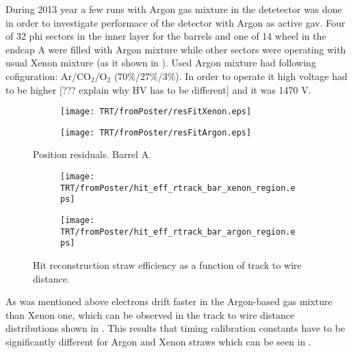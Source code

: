 During 2013 year a few runs with Argon gas mixture in the detetector was done in order to investigate performace of the detector with Argon as active gav.
Four of 32 phi sectors in the inner layer for the barrels and one of 14 wheel in the endcap A were filled with Argon mixture while other sectors were operating 
with usual Xenon mixture (as it shown in ). Used Argon mixture had following cofiguration: Ar/CO$_{2}$/O$_{2}$ (70$\%$/27$\%$/3$\%$). In order to operate it high voltage had
to be higher [??? explain why HV has to be different] and it was 1470 V.




\begin{figure}

\begin{subfigure}{.5\textwidth}
  \centering
  \texttt{[image: TRT/fromPoster/resFitXenon.eps]}
\end{subfigure}%
\begin{subfigure}{.5\textwidth}
  \centering
  \texttt{[image: TRT/fromPoster/resFitArgon.eps]}
\end{subfigure}

\caption{Position residuals. Barrel A.}
  \label{fig:resFit}
\end{figure}





\begin{figure}

\begin{subfigure}{.5\textwidth}
  \centering
  \texttt{[image: TRT/fromPoster/hit\_eff\_rtrack\_bar\_xenon\_region.eps]}
\end{subfigure}%
\begin{subfigure}{.5\textwidth}
  \centering
  \texttt{[image: TRT/fromPoster/hit\_eff\_rtrack\_bar\_argon\_region.eps]}
\end{subfigure}

\caption{Hit reconstruction straw efficiency as a function of track to wire distance.}
  \label{fig:hit_eff_rtrack_bar}
\end{figure}

As was mentioned above electrons drift faster in the Argon-based gas mixture than Xenon one, which can be observed in the track to wire distance
distributions shown in . 
This results that timing calibration constants have to be significantly different 
for Argon and Xenon straws which can be seen in . 


